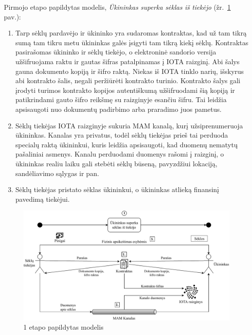 Pirmojo etapo papildytas modelis, \textit{Ūkininkas superka sėklas iš tiekėjo} (žr.~\ref{img:12} pav.):
\begin{enumerate}
    \item Tarp sėklų pardavėjo ir ūkininko yra sudaromas kontraktas, kad už tam tikrą sumą tam tikru metu ūkininkas galės įsigyti tam tikrą kiekį sėklų. Kontraktas pasirašomas ūkininko ir sėklų tiekėjo, o elektroninė sandorio versija užšifruojama raktu ir gautas šifras patalpinamas į IOTA raizginį. Abi šalys gauna dokumento kopiją ir šifro raktą. Niekas iš IOTA tinklo narių, išskyrus abi kontrakto šalis, negali peržiūrėti kontrakto turinio. Kontrakto šalys gali įrodyti turimos kontrakto kopijos autentiškumą užšifruodami šią kopiją ir patikrindami gauto šifro reikšmę su raizginyje esančiu šifru. Tai leidžia apsisaugoti nuo dokumentų padirbimo arba praradimo juos pametus. 
    \item Sėklų tiekėjas IOTA raizginyje sukuria MAM kanalą, kurį užsiprenumeruoja ūkininkas. Kanalas yra privatus, todėl sėklų tiekėjas prieš tai perduoda specialų raktą ūkininkui, kuris leidžia apsisaugoti, kad duomenų nematytų pašaliniai asmenys. Kanalu perduodami duomenys rašomi į raizginį, o ūkininkas realiu laiku gali stebėti sėklų būseną, pavyzdžiui lokaciją, sandėliavimo sąlygas ir pan.
    \item Sėklų tiekėjas pristato sėklas ūkininkui, o ūkininkas atlieką finansinį pavedimą tiekėjui.
\end{enumerate}

\begin{figure}[H]
    \centering
    \includegraphics[scale=0.74]{images/iota-usecase-1}
    \caption{1 etapo papildytas modelis}
    \label{img:12}
\end{figure}




